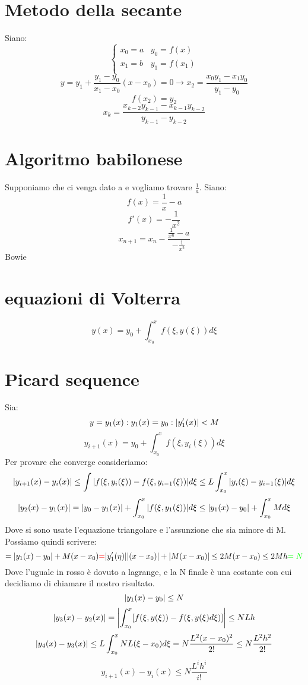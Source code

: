 \section{Metodo della secante}
Siano:
\[\begin{cases}
   x_0=a & y_0=f(x)\\
  x_1=b & y_1=f(x_1)\\
\end{cases}\]
\[y=y_1+\frac{y_1-y_0}{x_1-x_0}(x-x_0)=0 \rightarrow x_2=\frac{x_0y_1-x_1y_0}{y_1-y_0}\]
\[f(x_2)=y_2\]
\[x_k=\frac{x_{k-2}y_{k-1}-x_{k-1}y_{k-2}}{y_{k-1}-y_{k-2}}\]

\section{Algoritmo babilonese}
Supponiamo che ci venga dato a e vogliamo trovare $\frac{1}{a}$. Siano:
\[f(x)=\frac{1}{x}-a\]
\[f'(x)=-\frac{1}{x^2}\]
\[x_{n+1}=x_n-\frac{\frac{1}{x^n}-a}{-\frac{1}{x^2}}\]
Bowie

\section{equazioni di Volterra}
\[y(x)=y_0+\int_{x_0}^{x}f(\xi,y(\xi))d\xi\]

\section{Picard sequence}
Sia:
\[y=y_1(x) : y_1(x)=y_0 : \absolutevalue{y'_1(x)}<M\]
\[y_{i+1}(x)=y_0+\int_{x_0}^{x}f(\xi,y_i(\xi))d\xi\]
Per provare che converge consideriamo:
\[\absolutevalue{y_{i+1}(x)-y_{i}(x)}\le \int \absolutevalue{f(\xi,y_i(\xi))-f(\xi,y_{i-1}(\xi))}d\xi \le L \int_{x_0}^{x} \absolutevalue{y_i(\xi)-y_{i-1}(\xi)}d\xi\]
\[\absolutevalue{y_2(x)-y_1(x)}= \absolutevalue{y_0-y_1(x)}+\int_{x_0}^{x} \absolutevalue{f(\xi,y_1(\xi))}d\xi \le \absolutevalue{y_1(x)-y_0}+\int_{x_0}^{x} M d\xi\]
Dove si sono usate l'equazione triangolare e l'assunzione che sia minore di M. Possiamo quindi scrivere:
\[=\absolutevalue{y_1(x)-y_0}+M(x-x_0)\textcolor{red}{=}\absolutevalue{y'_1(\eta)}\absolutevalue{(x-x_0)}+\absolutevalue{M(x-x_0)} \le 2M(x-x_0)\le 2Mh \textcolor{green}{=N}\]
Dove l'uguale in rosso è dovuto a lagrange, e la N finale è una costante con cui decidiamo di chiamare il nostro risultato.
\[\absolutevalue{y_1(x)-y_0}\le N\]
\[\absolutevalue{y_3(x)-y_2(x)}= \absolutevalue{\int_{x_0}^{x}[f(\xi,y(\xi))-f(\xi,y(\xi)d\xi)]} \le NLh\]
\[\absolutevalue{y_4(x)-y_3(x)} \le L \int_{x_0}^{x}NL(\xi-x_0)d\xi=N\frac{L^2(x-x_0)^2}{2!}\le N\frac{L^2h^2}{2!}\]
\[y_{i+1}(x)-y_i(x)\le N\frac{L^ih^i}{i!}\]

